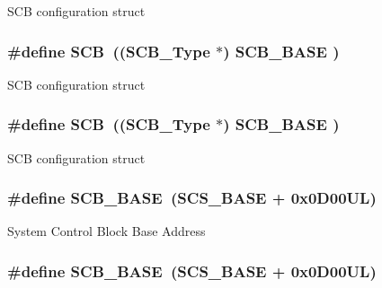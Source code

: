 S\-C\-B configuration struct \hypertarget{group___c_m_s_i_s__core__base_gaaaf6477c2bde2f00f99e3c2fd1060b01}{
\subsubsection[{S\-C\-B}]{\setlength{\rightskip}{0pt plus 5cm}\#define S\-C\-B~(({\bf S\-C\-B\-\_\-\-Type}       $\ast$)     {\bf S\-C\-B\-\_\-\-B\-A\-S\-E}      )}}\label{group___c_m_s_i_s__core__base_gaaaf6477c2bde2f00f99e3c2fd1060b01}
S\-C\-B configuration struct \hypertarget{group___c_m_s_i_s__core__base_gaaaf6477c2bde2f00f99e3c2fd1060b01}{
\subsubsection[{S\-C\-B}]{\setlength{\rightskip}{0pt plus 5cm}\#define S\-C\-B~(({\bf S\-C\-B\-\_\-\-Type}       $\ast$)     {\bf S\-C\-B\-\_\-\-B\-A\-S\-E}      )}}\label{group___c_m_s_i_s__core__base_gaaaf6477c2bde2f00f99e3c2fd1060b01}
S\-C\-B configuration struct \hypertarget{group___c_m_s_i_s__core__base_gad55a7ddb8d4b2398b0c1cfec76c0d9fd}{
\subsubsection[{S\-C\-B\-\_\-\-B\-A\-S\-E}]{\setlength{\rightskip}{0pt plus 5cm}\#define S\-C\-B\-\_\-\-B\-A\-S\-E~({\bf S\-C\-S\-\_\-\-B\-A\-S\-E} +  0x0\-D00\-U\-L)}}\label{group___c_m_s_i_s__core__base_gad55a7ddb8d4b2398b0c1cfec76c0d9fd}
System Control Block Base Address \hypertarget{group___c_m_s_i_s__core__base_gad55a7ddb8d4b2398b0c1cfec76c0d9fd}{
\subsubsection[{S\-C\-B\-\_\-\-B\-A\-S\-E}]{\setlength{\rightskip}{0pt plus 5cm}\#define S\-C\-B\-\_\-\-B\-A\-S\-E~({\bf S\-C\-S\-\_\-\-B\-A\-S\-E} +  0x0\-D00\-U\-L)}}\label{group___c_m_s_i_s__core__base_gad55a7ddb8d4b2398b0c1cfec76c0d9fd}
